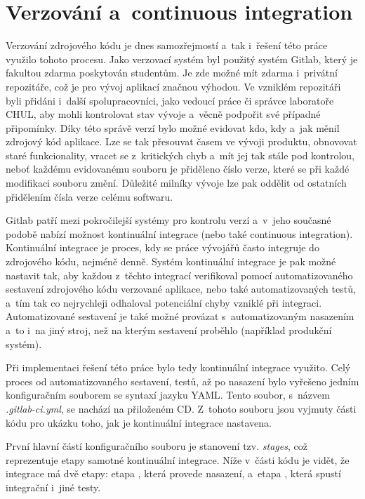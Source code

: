 \documentclass[thesis=M,czech]{FITthesis}[2012/06/26]
\begin{document}
\section{Verzování a~continuous integration} \label{sec:impl_gitlab}
Verzování zdrojového kódu je dnes samozřejmostí a~tak i~řešení této práce využilo tohoto procesu. Jako verzovací systém byl použitý systém Gitlab, který je fakultou zdarma poskytován studentům. Je zde možné mít zdarma i~privátní repozitáře, což je pro vývoj aplikací značnou výhodou. Ve vzniklém repozitáři byli přidáni i~další spolupracovníci, jako vedoucí práce či správce laboratoře CHUL, aby mohli kontrolovat stav vývoje a~věcně podpořit své případné připomínky. Díky této správě verzí bylo možné evidovat kdo, kdy a~jak měnil zdrojový kód aplikace. Lze se tak přesouvat časem ve vývoji produktu, obnovovat staré funkcionality, vracet se z~kritických chyb a~mít jej tak stále pod kontrolou, neboť každému evidovanému souboru je přiděleno číslo verze, které se při každé modifikaci souboru změní. Důležité milníky vývoje lze pak oddělit od ostatních přidělením čísla verze celému softwaru.

Gitlab patří mezi pokročilejší systémy pro kontrolu verzí a~v~jeho současné podobě nabízí možnost kontinuální integrace (nebo také continuous integration). Kontinuální integrace je proces, kdy se práce vývojářů často integruje do zdrojového kódu, nejméně denně. Systém kontinuální integrace je pak možné nastavit tak, aby každou z~těchto integrací verifikoval pomocí automatizovaného sestavení zdrojového kódu verzované aplikace, nebo také automatizovaných testů, a~tím tak co nejrychleji odhaloval potenciální chyby vzniklé při integraci. Automatizované sestavení je také možné provázat s~automatizovaným nasazením a~to i~na jiný stroj, než na kterým sestavení proběhlo (například produkční systém).

Při implementaci řešení této práce bylo tedy kontinuální integrace využito. Celý proces od automatizovaného sestavení, testů, až po nasazení bylo vyřešeno jedním konfiguračním souborem se syntaxí jazyku YAML. Tento soubor, s~názvem \textit{.gitlab-ci.yml}, se nachází na přiloženém CD. Z~tohoto souboru jsou vyjmuty části kódu pro ukázku toho, jak je kontinuální integrace nastavena.

První hlavní částí konfiguračního souboru je stanovení tzv. \textit{stages}, což reprezentuje etapy samotné kontinuální integrace. Níže v~části kódu je vidět, že integrace má dvě etapy: etapa , která provede nasazení, a~etapa , která spustí integrační i~jiné testy.\\
\end{document}
